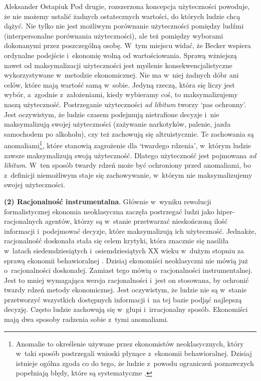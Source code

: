 \begin{artplenv}{Aleksander Ostapiuk}
Pod drugie, rozszerzona koncepcja użyteczności powoduje, że nie możemy ustalić żadnych ostatecznych wartości, do których
ludzie chcą dążyć. Nie tylko nie jest możliwym porównanie użyteczności pomiędzy ludźmi (interpersonalne
porównania użyteczności), ale też pomiędzy wyborami dokonanymi przez poszczególną osobę. W~tym miejscu widać, że Becker
wspiera ordynalne podejście i~ekonomię wolną od wartościowania. Sprawą wżniejszą nawet od maksymalizacji użyteczności
jest myślenie konsekwencjalistyczne wykorzystywane w~metodzie ekonomicznej. Nie ma w~niej żadnych dóbr ani celów, które
mają wartość samą w~sobie. Jedyną rzeczą, która się liczy jest wybór, a~zgodnie z~założeniami, kiedy wybieramy coś, to
maksymalizujemy naszą użyteczność. Postrzeganie użyteczności \textit{ad libitum }tworzy `pas ochronny'. Jest
oczywistym, że ludzie czasem podejmują nietrafione decyzje i~nie maksymalizują swojej użyteczności (zażywanie
narkotyków, palenie, jazda samochodem po alkoholu), czy też zachowują się altruistycznie. Te zachowania są
anomaliami\footnote{Anomalie to określenie używane przez ekonomistów neoklasycznych, który w~taki sposób postrzegali
wnioski płynące z~ekonomii behawioralnej. Dzisiaj istnieje ogólna zgoda co do tego, że ludzie z~powodu ograniczeń
poznawczych popełniają błędy, które są systematyczne
\parencite{thaler_misbehaving:_2015}.
}, które stanowią
zagrożenie dla `twardego rdzenia', w~którym ludzie zawsze maksymalizują swoją użyteczność. Dlatego użyteczność jest
pojmowana \textit{ad libitum}. W~ten sposób twardy rdzeń może być ochroniony przed anomaliami, bo z~definicji
niemożliwym staje się zachowywanie, w~którym nie maksymalizujemy swojej użyteczności. 

\textbf{(2) Racjonalność instrumentalna}. Głównie w~wyniku rewolucji formalistycznej ekonomia
neoklasyczna zaczęła postrzegać ludzi jako hiper-racjonalnych agentów, którzy są w~stanie przetwarzać nieskończoną
ilość informacji i~podejmować decyzje, które maksymalizują ich użyteczność. Jednakże, racjonalność doskonała
stała się celem krytyki, która znacznie się nasiliła w~latach siedemdziesiątych i~osiemdziesiątych XX wieku w~dużym
stopniu za sprawą ekonomii behawioralnej
\parencite{thaler_misbehaving:_2015}.
Dzisiaj ekonomiści neoklasyczni nie
mówią już o~racjonalności doskonałej. Zamiast tego mówią o~racjonalności instrumentalnej. Jest to mniej wymagająca
wersja racjonalności i~jest on stosowana, by ochronić twardy rdzeń metody ekonomicznej. Jest oczywistym, że ludzie nie
są w~stanie przetworzyć wszystkich dostępnych informacji i~na tej bazie podjąć najlepszą decyzję. Często ludzie
zachowują się w~głupi i~irracjonalny sposób. Ekonomiści mają dwa sposoby radzenia sobie z~tymi anomaliami.


\end{artplenv}
